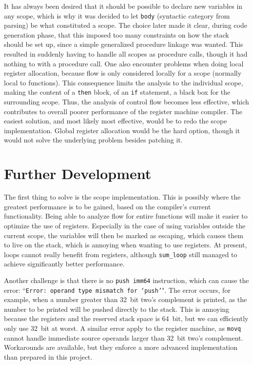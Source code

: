 It has always been desired that it should be possible to declare new variables in any scope, which is why it was decided to let \texttt{body} (syntactic category from parsing) be what constituted a scope. The choice later made it clear, during code generation phase, that this imposed too many constraints on how the stack should be set up, since a simple generalized procedure linkage was wanted. This resulted in suddenly having to handle all scopes as procedure calls, though it had nothing to with a procedure call. One also encounter problems when doing local register allocation, because flow is only considered locally for a scope (normally local to functions). This consequence limits the analysis to the individual scope, making the content of a \texttt{then} block, of an \texttt{if} statement, a black box for the surrounding scope. Thus, the analysis of control flow becomes less effective, which contributes to overall poorer performance of the register machine compiler. The easiest solution, and most likely most effective, would be to redo the scope implementation. Global register allocation would be the hard option, though it would not solve the underlying problem besides patching it.

\section{Further Development}
The first thing to solve is the scope implementation. This is possibly where the greatest performance is to be gained, based on the compiler's current functionality. Being able to analyze flow for entire functions will make it easier to optimize the use of registers. Especially in the case of using variables outside the current scope, the variables will then be marked as escaping, which causes them to live on the stack, which is annoying when wanting to use registers. At present, loops cannot really benefit from registers, although \texttt{sum\_loop} still managed to achieve significantly better performance.

Another challenge is that there is no \texttt{push imm64} instruction, which can cause the error: ``\texttt{Error: operand type mismatch for `push'}". The error occurs, for example, when a number greater than \SI{32}{bit} two's complement is printed, as the number to be printed will be pushed directly to the stack. This is annoying because the registers and the reserved stack space is \SI{64}{bit}, but we can efficiently only use \SI{32}{bit} at worst. A similar error apply to the register machine, as \texttt{movq} cannot handle immediate source operands larger than \SI{32}{bit} two's complement. Workarounds are available, but they enforce a more advanced implementation than prepared in this project. 

